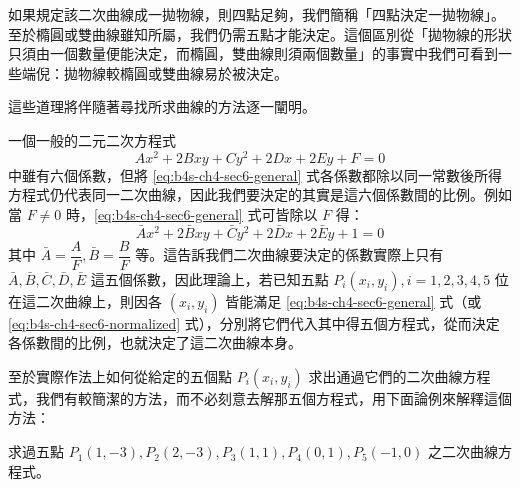 如果規定該二次曲線成一拋物線，則四點足夠，我們簡稱「四點決定一拋物線」。至於橢圓或雙曲線雖知所屬，我們仍需五點才能決定。這個區別從「拋物線的形狀只須由一個數量便能決定，而橢圓，雙曲線則須兩個數量」的事實中我們可看到一些端倪：拋物線較橢圓或雙曲線易於被決定。

這些道理將伴隨著尋找所求曲線的方法逐一闡明。

一個一般的二元二次方程式
\begin{equation}
Ax^2 + 2Bxy + Cy^2 + 2Dx + 2Ey + F = 0
\label{eq:b4s-ch4-sec6-general}
\end{equation}
中雖有六個係數，但將 \eqref{eq:b4s-ch4-sec6-general} 式各係數都除以同一常數後所得方程式仍代表同一二次曲線，因此我們要決定的其實是這六個係數間的比例。例如當 $F \ne 0$ 時，\eqref{eq:b4s-ch4-sec6-general} 式可皆除以 $F$ 得：
\begin{equation}
\bar{A}x^2 + 2\bar{B}xy + \bar{C}y^2 + 2\bar{D}x + 2\bar{E}y + 1 = 0
\label{eq:b4s-ch4-sec6-normalized}
\end{equation}
其中 $\bar{A} = \dfrac{A}{F}, \bar{B} = \dfrac{B}{F}$ 等。這告訴我們二次曲線要決定的係數實際上只有 $\bar{A}, \bar{B}, \bar{C}, \bar{D}, \bar{E}$ 這五個係數，因此理論上，若已知五點 $P_i(x_i, y_i), i=1,2,3,4,5$ 位在這二次曲線上，則因各 $(x_i, y_i)$ 皆能滿足 \eqref{eq:b4s-ch4-sec6-general} 式（或 \eqref{eq:b4s-ch4-sec6-normalized} 式），分別將它們代入其中得五個方程式，從而決定各係數間的比例，也就決定了這二次曲線本身。

至於實際作法上如何從給定的五個點 $P_i(x_i, y_i)$ 求出通過它們的二次曲線方程式，我們有較簡潔的方法，而不必刻意去解那五個方程式，用下面論例來解釋這個方法：

\begin{discussion}
求過五點 $P_1(1, -3), P_2(2, -3), P_3(1, 1), P_4(0, 1), P_5(-1, 0)$ 之二次曲線方程式。
\end{discussion}

